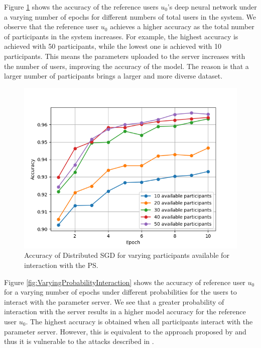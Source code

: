 \documentclass[letterpaper]{article}
\begin{document}
\begin{flushleft}
{Figure \ref{fig:VaryingPoolofParticipants} shows the accuracy of the reference users $u_0$'s deep neural network under a varying number
of epochs for different numbers of total users in the system. We observe that  the reference user $u_0$ achieves a higher accuracy as
the total number of participants in the system increases. For example, the highest accuracy is achieved with 50 participants, while the
lowest one is achieved with 10 participants. This means the parameters uploaded to the server increases with the number of users, improving the accuracy of the
model. The reason is that a larger  number of participants brings a larger and more diverse dataset. 
\begin{figure}[H]
  \centering
    \includegraphics[width=5in]{VaryingPoolofParticipantsGrid.png}
    \caption[Distributed SGD for varying participant.]{\label{fig:VaryingPoolofParticipants} Accuracy of Distributed SGD for varying participants available for interaction with the PS.}
  \end{figure}





Figure \ref{fig:VaryingProbabilityInteraction} shows the accuracy of reference user $u_0$ for a varying number of epochs under
different probabilities for the users to interact with the parameter server. 
We see that a greater probability of interaction with the server results in a higher model accuracy for the reference user $u_0$.
The highest accuracy is obtained when all participants interact with the parameter server. However, this is equivalent to the
approach proposed by \cite{shokri2015privacy} and thus it is vulnerable to the attacks described in \cite{hitaj2017deep}. 

}
\end{flushleft}
\end{document}
